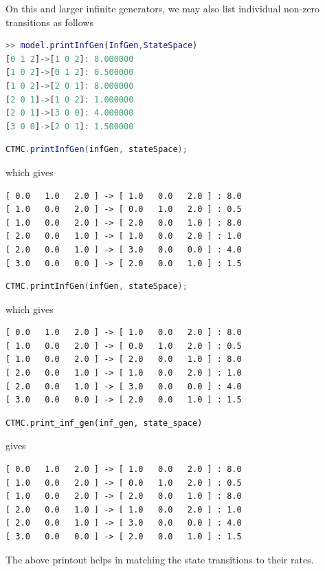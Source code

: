 On this and larger infinite generators, we may also list individual non-zero transitions as follows
\begin{MATLAB}
\begin{lstlisting}[language = matlab]
>> model.printInfGen(InfGen,StateSpace)
[0 1 2]->[1 0 2]: 8.000000
[1 0 2]->[0 1 2]: 0.500000
[1 0 2]->[2 0 1]: 8.000000
[2 0 1]->[1 0 2]: 1.000000
[2 0 1]->[3 0 0]: 4.000000
[3 0 0]->[2 0 1]: 1.500000
\end{lstlisting}
\end{MATLAB}
\begin{JAVA}
\begin{lstlisting}[language=java, basicstyle=\ttfamily\scriptsize]
CTMC.printInfGen(infGen, stateSpace);
\end{lstlisting}
which gives
\begin{lstlisting}[basicstyle=\ttfamily\scriptsize]
[ 0.0   1.0   2.0 ] -> [ 1.0   0.0   2.0 ] : 8.0
[ 1.0   0.0   2.0 ] -> [ 0.0   1.0   2.0 ] : 0.5
[ 1.0   0.0   2.0 ] -> [ 2.0   0.0   1.0 ] : 8.0
[ 2.0   0.0   1.0 ] -> [ 1.0   0.0   2.0 ] : 1.0
[ 2.0   0.0   1.0 ] -> [ 3.0   0.0   0.0 ] : 4.0
[ 3.0   0.0   0.0 ] -> [ 2.0   0.0   1.0 ] : 1.5
\end{lstlisting}
\end{JAVA}
\begin{KOTLIN}
\begin{lstlisting}[language=kotlin, basicstyle=\ttfamily\scriptsize]
CTMC.printInfGen(infGen, stateSpace);
\end{lstlisting}
which gives
\begin{lstlisting}[basicstyle=\ttfamily\scriptsize]
[ 0.0   1.0   2.0 ] -> [ 1.0   0.0   2.0 ] : 8.0
[ 1.0   0.0   2.0 ] -> [ 0.0   1.0   2.0 ] : 0.5
[ 1.0   0.0   2.0 ] -> [ 2.0   0.0   1.0 ] : 8.0
[ 2.0   0.0   1.0 ] -> [ 1.0   0.0   2.0 ] : 1.0
[ 2.0   0.0   1.0 ] -> [ 3.0   0.0   0.0 ] : 4.0
[ 3.0   0.0   0.0 ] -> [ 2.0   0.0   1.0 ] : 1.5
\end{lstlisting}
\end{KOTLIN}
\begin{PYTHON}
\begin{lstlisting}[language=python]
CTMC.print_inf_gen(inf_gen, state_space)
\end{lstlisting}
gives
\begin{lstlisting}[basicstyle=\ttfamily\scriptsize]
[ 0.0   1.0   2.0 ] -> [ 1.0   0.0   2.0 ] : 8.0
[ 1.0   0.0   2.0 ] -> [ 0.0   1.0   2.0 ] : 0.5
[ 1.0   0.0   2.0 ] -> [ 2.0   0.0   1.0 ] : 8.0
[ 2.0   0.0   1.0 ] -> [ 1.0   0.0   2.0 ] : 1.0
[ 2.0   0.0   1.0 ] -> [ 3.0   0.0   0.0 ] : 4.0
[ 3.0   0.0   0.0 ] -> [ 2.0   0.0   1.0 ] : 1.5
\end{lstlisting}
\end{PYTHON}
The above printout helps in matching the state transitions to their rates.


